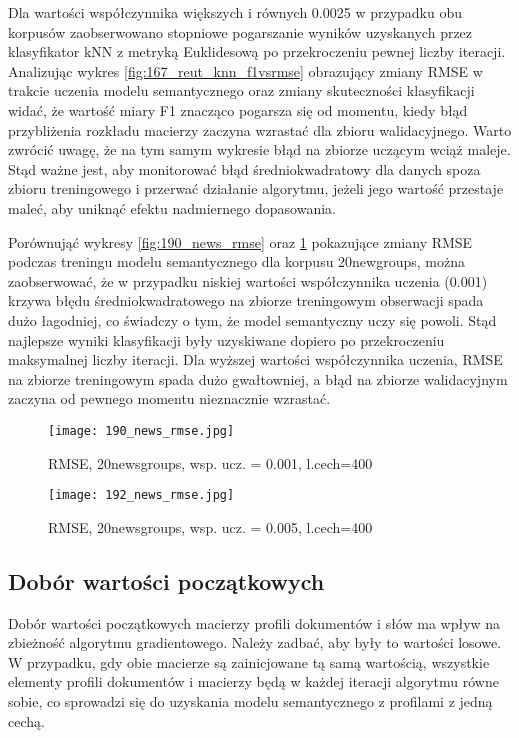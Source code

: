 \documentclass{pracamgr}
\begin{document}
Dla wartości współczynnika większych i równych 0.0025 w przypadku obu korpusów zaobserwowano stopniowe pogarszanie wyników uzyskanych przez klasyfikator kNN z metryką Euklidesową po przekroczeniu pewnej liczby iteracji. Analizując wykres \ref{fig:167_reut_knn_f1vsrmse} obrazujący zmiany RMSE w trakcie uczenia modelu semantycznego oraz zmiany skuteczności klasyfikacji widać, że wartość miary F1 znacząco pogarsza się od momentu, kiedy błąd przybliżenia rozkładu macierzy zaczyna wzrastać dla zbioru walidacyjnego. Warto zwrócić uwagę, że na tym samym wykresie błąd na zbiorze uczącym wciąż maleje. Stąd ważne jest, aby monitorować błąd średniokwadratowy dla danych spoza zbioru treningowego i przerwać działanie algorytmu, jeżeli jego wartość przestaje maleć, aby uniknąć efektu nadmiernego dopasowania.

Porównująć wykresy \ref{fig:190_news_rmse} oraz \ref{fig:192_news_rmse} pokazujące zmiany RMSE podczas treningu modelu semantycznego dla korpusu 20newgroups, można zaobserwować, że w przypadku niskiej wartości współczynnika uczenia (0.001) krzywa błędu średniokwadratowego na zbiorze treningowym obserwacji spada dużo łagodniej, co świadczy o tym, że model semantyczny uczy się powoli. Stąd najlepsze wyniki klasyfikacji były uzyskiwane dopiero po przekroczeniu maksymalnej liczby iteracji. Dla wyższej wartości współczynnika uczenia, RMSE na zbiorze treningowym spada dużo gwałtowniej, a błąd na zbiorze walidacyjnym zaczyna od pewnego momentu nieznacznie wzrastać.

\begin{figure}[]
  \texttt{[image: 190\_news\_rmse.jpg]}
  \caption{RMSE, 20newsgroups, wsp. ucz. = 0.001, l.cech=400}\label{fig:190_news_rmse}
\endminipage\hfill
{}%
  \texttt{[image: 192\_news\_rmse.jpg]}
  \caption{RMSE, 20newsgroups, wsp. ucz. = 0.005, l.cech=400}\label{fig:192_news_rmse}
\endminipage\hfill
\end{figure}

\subsection{Dobór wartości początkowych}

Dobór wartości początkowych macierzy profili dokumentów i słów ma wpływ na zbieżność algorytmu  gradientowego. Należy zadbać, aby były to wartości losowe. W przypadku, gdy obie macierze są zainicjowane tą samą wartością, wszystkie elementy profili dokumentów i macierzy będą w każdej iteracji algorytmu równe sobie, co sprowadzi się do uzyskania modelu semantycznego z profilami z jedną cechą. 
\end{document}
